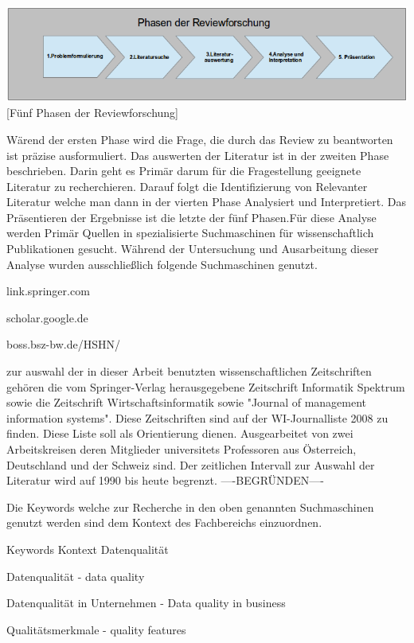 \documentclass[12pt,a4paper,bibliography=totocnumbered,listof=totocnumbered]{scrartcl}
\begin{document}
\vspace{1em}
\begin{minipage}{\linewidth}
	\centering
	\includegraphics[width=1\linewidth]{Bilder/phasen.png}
	[Fünf Phasen der Reviewforschung]
	\label{Fünf Phasen der Reviewforschung}
\end{minipage}

Wärend der ersten Phase wird die Frage, die durch das Review zu beantworten
ist präzise ausformuliert. Das auswerten der Literatur ist in der zweiten Phase beschrieben. Darin geht es Primär darum für die Fragestellung geeignete Literatur zu recherchieren. Darauf folgt die Identifizierung von Relevanter Literatur welche man dann in der vierten Phase Analysiert und Interpretiert. Das Präsentieren der Ergebnisse ist die letzte der fünf Phasen.Für diese Analyse werden Primär Quellen in spezialisierte Suchmaschinen für wissenschaftlich Publikationen gesucht. Während der Untersuchung und Ausarbeitung dieser Analyse wurden ausschließlich folgende
Suchmaschinen genutzt.
\begin{compactitem}
	\item link.springer.com
	\item scholar.google.de
	\item boss.bsz-bw.de/HSHN/
\end{compactitem}
zur auswahl der in dieser Arbeit benutzten wissenschaftlichen Zeitschriften  gehören die vom Springer-Verlag herausgegebene Zeitschrift Informatik Spektrum sowie die Zeitschrift Wirtschaftsinformatik sowie "Journal of management information systems". Diese Zeitschriften sind auf der WI-Journalliste 2008 zu finden. Diese Liste soll als Orientierung dienen. Ausgearbeitet von  zwei Arbeitskreisen deren Mitglieder universitets Professoren aus Österreich, Deutschland und der Schweiz sind\cite{WiLis}.
Der zeitlichen Intervall zur Auswahl der Literatur wird auf 1990 bis heute begrenzt. ----BEGRÜNDEN----

Die Keywords welche zur Recherche in den oben genannten Suchmaschinen genutzt werden sind dem Kontext des Fachbereichs einzuordnen.

Keywords Kontext Datenqualität
\begin{compactitem}
	\item Datenqualität - data quality
	\item Datenqualität in Unternehmen - Data quality in business
	\item Qualitätsmerkmale - quality features
\end{compactitem}
\end{document}
